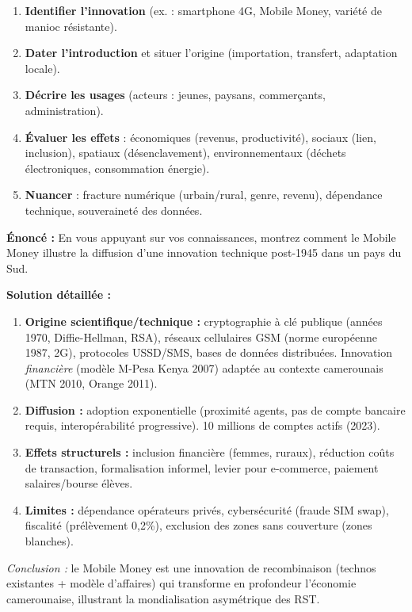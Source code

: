 \documentclass[11pt]{article}
\newcommand{\cle}[1]{{\popxbold\color{popdark}#1}}
\begin{document}
\begin{methode}
\begin{enumerate}
    \item \textbf{Identifier l'innovation} (ex. : smartphone 4G, Mobile Money, variété de manioc résistante).
    \item \textbf{Dater l'introduction} et situer l'origine (importation, transfert, adaptation locale).
    \item \textbf{Décrire les usages} (acteurs : jeunes, paysans, commerçants, administration).
    \item \textbf{Évaluer les effets} : économiques (revenus, productivité), sociaux (lien, inclusion), spatiaux (désenclavement), environnementaux (déchets électroniques, consommation énergie).
    \item \textbf{Nuancer} : fracture numérique (urbain/rural, genre, revenu), dépendance technique, souveraineté des données.
\end{enumerate}
\end{methode}

\begin{exoresolu}
\textbf{Énoncé :} En vous appuyant sur vos connaissances, montrez comment le Mobile Money illustre la diffusion d'une innovation technique post-1945 dans un pays du Sud.

\textbf{Solution détaillée :}
\begin{enumerate}
    \item \textbf{Origine scientifique/technique :} cryptographie à clé publique (années 1970, Diffie-Hellman, RSA), réseaux cellulaires GSM (norme européenne 1987, 2G), protocoles USSD/SMS, bases de données distribuées. Innovation \emph{financière} (modèle M-Pesa Kenya 2007) adaptée au contexte camerounais (MTN 2010, Orange 2011).
    \item \textbf{Diffusion :} adoption exponentielle (proximité agents, pas de compte bancaire requis, interopérabilité progressive). 10 millions de comptes actifs (2023).
    \item \textbf{Effets structurels :} inclusion financière (femmes, ruraux), réduction coûts de transaction, formalisation informel, levier pour e-commerce, paiement salaires/bourse élèves.
    \item \textbf{Limites :} dépendance opérateurs privés, cybersécurité (fraude SIM swap), fiscalité (prélèvement 0,2\%), exclusion des zones sans couverture (zones blanches).
\end{enumerate}
\emph{Conclusion :} le Mobile Money est une innovation de \cle{recombinaison} (technos existantes + modèle d'affaires) qui transforme en profondeur l'économie camerounaise, illustrant la mondialisation asymétrique des RST.
\end{exoresolu}
\end{document}
